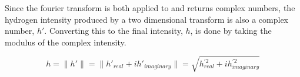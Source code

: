 
Since the fourier transform is both applied to and returns complex
numbers, the hydrogen intensity produced by a two dimensional
transform is also a complex number, $h'$. Converting this to the
final intensity, $h$, is done by taking the modulus of the complex
intensity.

\begin{displaymath}
  h = \|h'\| = \|h'_{real} + i h'_{imaginary}\| = \sqrt{h_{real}^{'2} + i h_{imaginary}^{'2}}
\end{displaymath}


